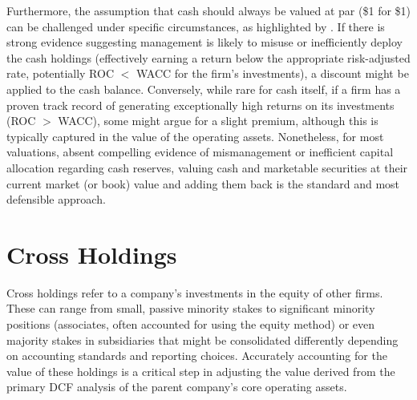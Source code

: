 Furthermore, the assumption that cash should always be valued at par (\$1 for \$1) can be challenged under specific circumstances, as highlighted by \textcite{damodaran_cash_and_other}. If there is strong evidence suggesting management is likely to misuse or inefficiently deploy the cash holdings (effectively earning a return below the appropriate risk-adjusted rate, potentially ROC $<$ WACC for the firm's investments), a discount might be applied to the cash balance. Conversely, while rare for cash itself, if a firm has a proven track record of generating exceptionally high returns on its investments (ROC $>$ WACC), some might argue for a slight premium, although this is typically captured in the value of the operating assets.
Nonetheless, for most valuations, absent compelling evidence of mismanagement or inefficient capital allocation regarding cash reserves, valuing cash and marketable securities at their current market (or book) value and adding them back is the standard and most defensible approach.

\section{Cross Holdings}

Cross holdings refer to a company's investments in the equity of other firms. These can range from small, passive minority stakes to significant minority positions (associates, often accounted for using the equity method) or even majority stakes in subsidiaries that might be consolidated differently depending on accounting standards and reporting choices. Accurately accounting for the value of these holdings is a critical step in adjusting the value derived from the primary DCF analysis of the parent company's core operating assets.

